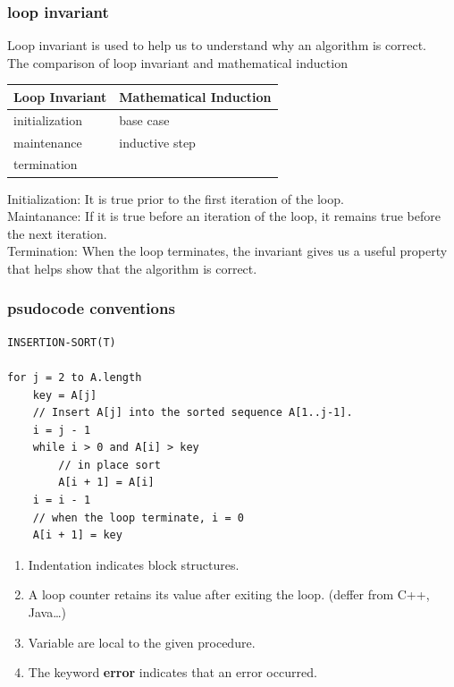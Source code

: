 \documentclass[11pt]{article}
\begin{document}
\subsubsection{loop invariant}
\label{sec-2-2-1}
Loop invariant is used to help us to understand why an algorithm is correct. \\

The comparison of loop invariant and mathematical induction \\
\begin{center}
\begin{tabular}{|l|l|}
\hline
Loop Invariant & Mathematical Induction \\
\hline
initialization & base case \\
\hline
maintenance & inductive step \\
\hline
termination & \\
\hline
\end{tabular}
\end{center}

Initialization: It is true prior to the first iteration of the loop. \\
Maintanance:    If it is true before an iteration of the loop, it remains true before the next iteration. \\
Termination:    When the loop terminates, the invariant gives us a useful property that helps show that the algorithm is correct. \\
\subsubsection{psudocode conventions}
\label{sec-2-2-2}
\begin{verbatim}
INSERTION-SORT(T)

for j = 2 to A.length
    key = A[j]
    // Insert A[j] into the sorted sequence A[1..j-1].
    i = j - 1
    while i > 0 and A[i] > key
        // in place sort
        A[i + 1] = A[i]
	i = i - 1
    // when the loop terminate, i = 0
    A[i + 1] = key
\end{verbatim}


\begin{enumerate}
\item Indentation indicates block structures. \\
\item A loop counter retains its value after exiting the loop. (deffer from C++, Java\ldots{}) \\
\item Variable are local to the given procedure. \\
\item The keyword \textbf{error} indicates that an error occurred. \\
\end{enumerate}
\end{document}
